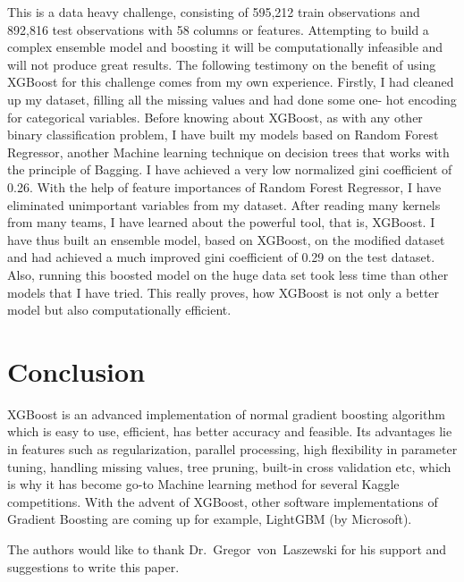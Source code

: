 This is a data heavy challenge, consisting of 595,212 train observations and
892,816 test observations with 58 columns or features. Attempting to build a
complex ensemble model and boosting it will be computationally infeasible and
will not produce great results. The following testimony on the benefit of
using XGBoost for this challenge comes from my own experience. Firstly, I had
cleaned up my dataset, filling all the missing values and had done some one-
hot encoding for categorical variables. Before knowing about XGBoost, as with
any other binary classification problem, I have built my models based on
Random Forest Regressor, another Machine learning technique on decision trees
that works with the principle of Bagging. I have achieved a very low
normalized gini coefficient of 0.26. With the help of feature importances of
Random Forest Regressor, I have eliminated unimportant variables from my
dataset. After reading many kernels from many teams, I have learned about the
powerful tool, that is, XGBoost. I have thus built an ensemble model, based on
XGBoost, on the modified dataset and had achieved a much improved gini
coefficient of 0.29 on the test dataset. Also, running this boosted model on
the huge data set took less time than other models that I have tried. This
really proves, how XGBoost is not only a better model but also computationally
efficient.

\section{Conclusion} 

XGBoost is an advanced implementation of normal gradient boosting algorithm
which is easy to use, efficient, has better accuracy and feasible. Its
advantages lie in features such as regularization, parallel processing, high
flexibility in parameter tuning, handling missing values, tree pruning,
built-in cross validation etc, which is why it has become go-to Machine
learning method for several Kaggle competitions. With the advent of XGBoost,
other software implementations of Gradient Boosting are coming up for example,
LightGBM (by Microsoft).

\begin{acks}

  The authors would like to thank Dr.~Gregor~von~Laszewski for his
  support and suggestions to write this paper.

\end{acks}


 

